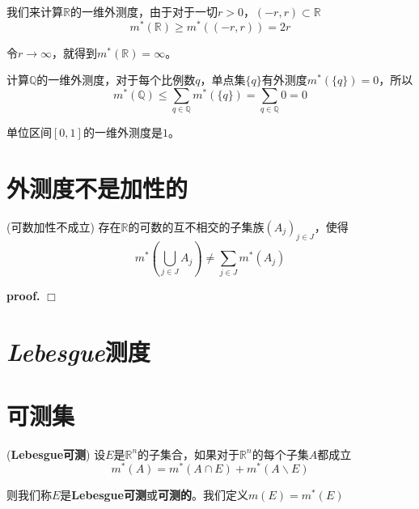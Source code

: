 我们来计算$\mathbb{R}$的一维外测度，由于对于一切$r>0$，$(-r,r)\subset \mathbb{R}$
\begin{equation}
    m^*(\mathbb{R})\geqslant m^*((-r,r))=2r
\end{equation}

令$r\rightarrow \infty$，就得到$m^*(\mathbb{R})=\infty$。

计算$\mathbb{Q}$的一维外测度，对于每个比例数$q$，单点集$\{q\}$有外测度$m^*(\{q\})=0$，所以
\begin{equation}
    m^*(\mathbb{Q})\leqslant \sum_{q\in \mathbb{Q}}m^*(\{q\})=\sum_{q\in \mathbb{Q}}0=0
\end{equation}

单位区间$[0,1]$的一维外测度是$1$。

\section{外测度不是加性的}
\begin{mdframed}
    \begin{proposition}
        (可数加性不成立) 存在$\mathbb{R}$的可数的互不相交的子集族$(A_j)_{j\in J}$，使得
        \begin{equation}
            m^*(\bigcup_{j\in J}A_j)\neq \sum_{j\in J}m^*(A_j)
        \end{equation}
    \end{proposition}
\end{mdframed}
\textbf{proof.} $\Box$

\section{\textsl{Lebesgue}测度}

\section{可测集}

\begin{mdframed}
    \begin{define}
        (\textbf{Lebesgue可测}) 设$E$是$\mathbb{R}^n$的子集合，如果对于$\mathbb{R}^n$的每个子集$A$都成立
        \begin{equation}
            m^*(A)=m^*(A\cap E)+m^*(A\backslash E)
        \end{equation}

        则我们称$E$是\textbf{Lebesgue可测}或\textbf{可测的}。我们定义$m(E)=m^*(E)$
    \end{define}
\end{mdframed}

